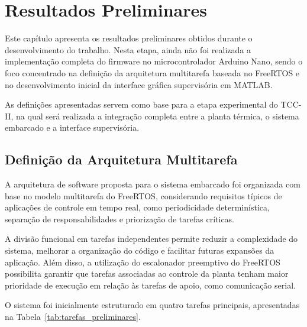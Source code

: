 \documentclass[repeatfields,xlists,xpacks,oneside]{ufrgscca}
\begin{document}
\chapter{Resultados Preliminares}
\label{cap:resultados_preliminares}

Este capítulo apresenta os resultados preliminares obtidos
durante o desenvolvimento do trabalho. Nesta etapa, ainda
não foi realizada a implementação completa do firmware no
microcontrolador Arduino Nano, sendo o foco concentrado na
definição da arquitetura multitarefa baseada no FreeRTOS e
no desenvolvimento inicial da interface gráfica supervisória
em MATLAB.

As definições apresentadas servem como base para a etapa
experimental do TCC-II, na qual será realizada a integração
completa entre a planta térmica, o sistema embarcado e a
interface supervisória.

\section{Definição da Arquitetura Multitarefa}

A arquitetura de software proposta para o sistema embarcado
foi organizada com base no modelo multitarefa do FreeRTOS,
considerando requisitos típicos de aplicações de controle em
tempo real, como periodicidade determinística, separação de
responsabilidades e priorização de tarefas críticas.

A divisão funcional em tarefas independentes permite reduzir
a complexidade do sistema, melhorar a organização do código
e facilitar futuras expansões da aplicação. Além disso, a
utilização do escalonador preemptivo do FreeRTOS possibilita
garantir que tarefas associadas ao controle da planta tenham
maior prioridade de execução em relação às tarefas de apoio,
como comunicação serial.

O sistema foi inicialmente estruturado em quatro tarefas
principais, apresentadas na
Tabela~\ref{tab:tarefas_preliminares}.
\end{document}
